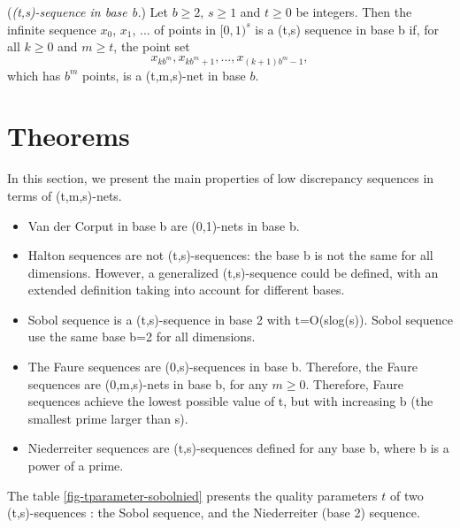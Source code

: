 \begin{definition}
(\emph{(t,s)-sequence in base b.})
      Let $b\geq 2$, $s\geq 1$ and $t\geq 0$ be integers.
      Then the infinite sequence $x_0$, $x_1$, ... of points in $[0,1)^s$
      is a (t,s) sequence in base b if,
      for all $k\geq 0$ and $m\geq t$, the point set
$$
x_{kb^m},x_{kb^m+1},...,x_{(k+1)b^m-1},
$$  
      which has $b^m$ points, is a (t,m,s)-net in base $b$.
\end{definition}
    

\section{Theorems}

In this section, we present the main properties of low discrepancy 
sequences in terms of (t,m,s)-nets.

\begin{itemize}

\item Van der Corput in base b are (0,1)-nets in base b.
        
\item Halton sequences are not (t,s)-sequences: the base b is not
          the same for all dimensions. 
          However, a generalized (t,s)-sequence could be defined, 
          with an extended definition taking into account for different 
          bases. 
        
\item Sobol sequence is a (t,s)-sequence in base 2 with t=O(slog(s)).
          Sobol sequence use the same base b=2 for all dimensions.
        
\item The Faure sequences are (0,s)-sequences in base b.
          Therefore, the Faure sequences are (0,m,s)-nets in
          base b, for any $m\geq 0$.
          Therefore, Faure sequences achieve the lowest possible
          value of t, but with increasing b (the smallest prime larger than s).
        
\item Niederreiter sequences are (t,s)-sequences defined for any base b,
          where b is a power of a prime.
\end{itemize}

    
The table \ref{fig-tparameter-sobolnied} presents the quality parameters $t$ of two (t,s)-sequences : 
the Sobol sequence, and the Niederreiter (base 2) sequence.

